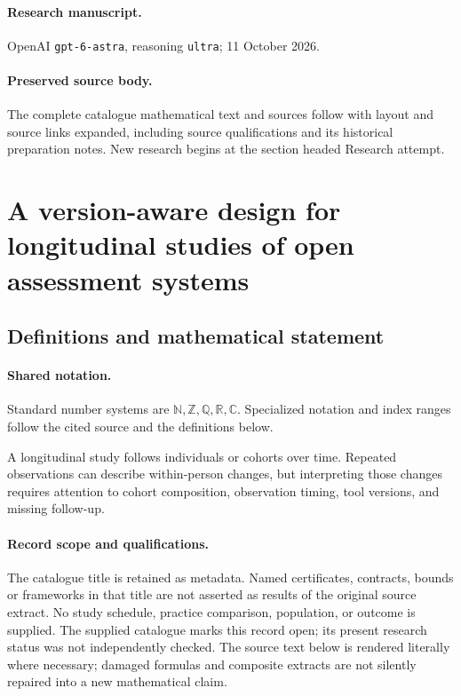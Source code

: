 \documentclass[11pt]{article}
\begin{document}
\paragraph{Research manuscript.} OpenAI \texttt{gpt-6-astra}, reasoning \texttt{ultra}; 11 October 2026.
\paragraph{Preserved source body.} The complete catalogue mathematical text and sources follow with layout and source links expanded, including source qualifications and its historical preparation notes. New research begins at the section headed Research attempt.

\section{A version-aware design for longitudinal studies of open assessment systems}\label{statement}

\subsection{Definitions and mathematical statement}

\paragraph{Shared notation.}Standard number systems are $\mathbb N,\mathbb Z,\mathbb Q,\mathbb R,\mathbb C$. Specialized notation and index ranges follow the cited source and the definitions below.


A longitudinal study follows individuals or cohorts over time. Repeated observations can describe within-person changes, but interpreting those changes requires attention to cohort composition, observation timing, tool versions, and missing follow-up.
\paragraph{Record scope and qualifications.}
The catalogue title is retained as metadata. Named certificates, contracts, bounds or frameworks in that title are not asserted as results of the original source extract.
No study schedule, practice comparison, population, or outcome is supplied. The supplied catalogue marks this record open; its present research status was not independently checked.
The source text below is rendered literally where necessary; damaged formulas and composite extracts are not silently repaired into a new mathematical claim.
\end{document}
